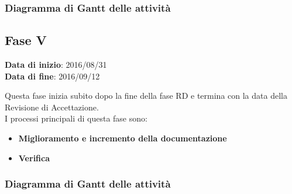 		\subsubsection{Diagramma di Gantt delle attività}
		
	\subsection{Fase V}
	\begin{center}
		\textbf{Data di inizio}: 2016/08/31 \\
		\textbf{Data di fine}: 2016/09/12 \\
	\end{center}
	Questa fase inizia subito dopo la fine della fase RD e termina con la data della Revisione di Accettazione. \\
	I processi principali di questa fase sono:
		\begin{itemize}
			\item \textbf{Miglioramento e incremento della documentazione}
			\att
			\item \textbf{Verifica}
		\end{itemize}
		\subsubsection{Diagramma di Gantt delle attività}
	

